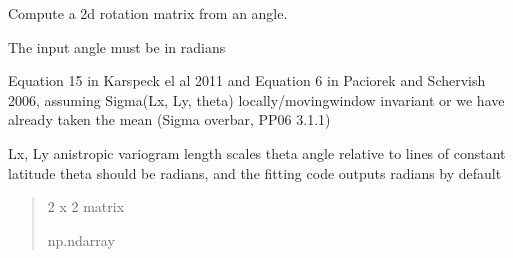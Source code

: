 \documentclass[letterpaper,10pt,english]{sphinxmanual}
\begin{document}
\begin{fulllineitems}
\label{\detokenize{misc:glomar_gridding.distances.rot_mat}}
\pysigstartsignatures
\pysiglinewithargsret
{}
{}
{}
\pysigstopsignatures
\sphinxAtStartPar
Compute a 2d rotation matrix from an angle.

\sphinxAtStartPar
The input angle must be in radians
\begin{quote}\begin{description}
\sphinxAtStartPar
{}

\end{description}\end{quote}

\end{fulllineitems}


\begin{fulllineitems}
\label{\detokenize{misc:glomar_gridding.distances.sigma_rot_func}}
\pysigstartsignatures
\pysiglinewithargsret
{}
{\sphinxparamcomma {}\sphinxparamcomma {}}
{}
\pysigstopsignatures
\sphinxAtStartPar
Equation 15 in Karspeck el al 2011 and Equation 6
in Paciorek and Schervish 2006,
assuming Sigma(Lx, Ly, theta) locally/moving\sphinxhyphen{}window invariant or
we have already taken the mean (Sigma overbar, PP06 3.1.1)

\sphinxAtStartPar
Lx, Ly \sphinxhyphen{} anistropic variogram length scales
theta \sphinxhyphen{} angle relative to lines of constant latitude
theta should be radians, and the fitting code outputs radians by default
\begin{quote}\begin{description}
\sphinxAtStartPar
{} \textendash{} 2 x 2 matrix

\sphinxAtStartPar
np.ndarray

\end{description}\end{quote}

\end{fulllineitems}
\end{document}
